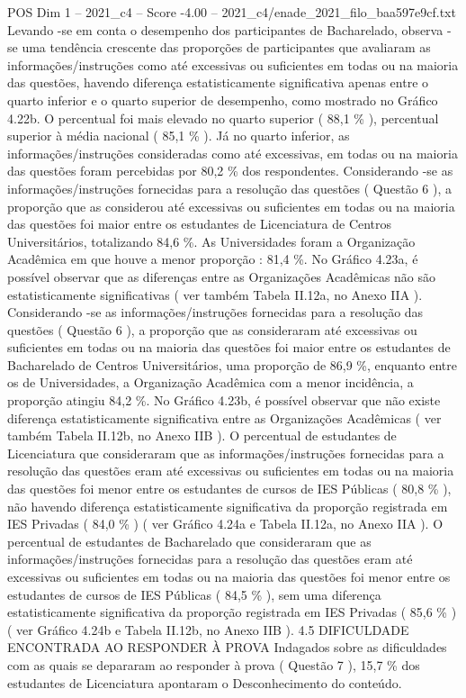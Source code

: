 \begin{textsample}{POS Dim 1 – 2021\_c4 – Score -4.00 – 2021\_c4/enade\_2021\_filo\_baa597e9cf.txt}
Levando -se em conta o desempenho dos participantes de Bacharelado, observa -se uma tendência crescente das proporções de participantes que avaliaram as informações/instruções como até excessivas ou suficientes em todas ou na maioria das questões, havendo diferença estatisticamente significativa apenas entre o quarto inferior e o quarto superior de desempenho, como mostrado no Gráfico 4.22b.
O percentual foi mais elevado no quarto superior ( 88,1 \% ), percentual superior à média nacional ( 85,1 \% ).
Já no quarto inferior, as informações/instruções consideradas como até excessivas, em todas ou na maioria das questões foram percebidas por 80,2 \% dos respondentes.
Considerando -se as informações/instruções fornecidas para a resolução das questões ( Questão 6 ), a proporção que as considerou até excessivas ou suficientes em todas ou na maioria das questões foi maior entre os estudantes de Licenciatura de Centros Universitários, totalizando 84,6 \%.
As Universidades foram a Organização Acadêmica em que houve a menor proporção : 81,4 \%.
No Gráfico 4.23a, é possível observar que as diferenças entre as Organizações Acadêmicas não são estatisticamente significativas ( ver também Tabela II.12a, no Anexo IIA ).
Considerando -se as informações/instruções fornecidas para a resolução das questões ( Questão 6 ), a proporção que as consideraram até excessivas ou suficientes em todas ou na maioria das questões foi maior entre os estudantes de Bacharelado de Centros Universitários, uma proporção de 86,9 \%, enquanto entre os de Universidades, a Organização Acadêmica com a menor incidência, a proporção atingiu 84,2 \%.
No Gráfico 4.23b, é possível observar que não existe diferença estatisticamente significativa entre as Organizações Acadêmicas ( ver também Tabela II.12b, no Anexo IIB ).
O percentual de estudantes de Licenciatura que consideraram que as informações/instruções fornecidas para a resolução das questões eram até excessivas ou suficientes em todas ou na maioria das questões foi menor entre os estudantes de cursos de IES Públicas ( 80,8 \% ), não havendo diferença estatisticamente significativa da proporção registrada em IES Privadas ( 84,0 \% ) ( ver Gráfico 4.24a e Tabela II.12a, no Anexo IIA ).
O percentual de estudantes de Bacharelado que consideraram que as informações/instruções fornecidas para a resolução das questões eram até excessivas ou suficientes em todas ou na maioria das questões foi menor entre os estudantes de cursos de IES Públicas ( 84,5 \% ), sem uma diferença estatisticamente significativa da proporção registrada em IES Privadas ( 85,6 \% ) ( ver Gráfico 4.24b e Tabela II.12b, no Anexo IIB ). 4.5 DIFICULDADE ENCONTRADA AO RESPONDER À PROVA Indagados sobre as dificuldades com as quais se depararam ao responder à prova ( Questão 7 ), 15,7 \% dos estudantes de Licenciatura apontaram o Desconhecimento do conteúdo.

\end{textsample}
